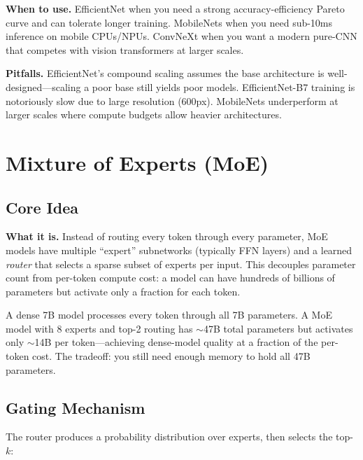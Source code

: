 \textbf{When to use.} EfficientNet when you need a strong accuracy-efficiency Pareto curve and can tolerate longer training. MobileNets when you need sub-10ms inference on mobile CPUs/NPUs. ConvNeXt when you want a modern pure-CNN that competes with vision transformers at larger scales.

\textbf{Pitfalls.} EfficientNet's compound scaling assumes the base architecture is well-designed---scaling a poor base still yields poor models. EfficientNet-B7 training is notoriously slow due to large resolution (600px). MobileNets underperform at larger scales where compute budgets allow heavier architectures.

\section{Mixture of Experts (MoE)}
\label{sec:moe}

\subsection{Core Idea}

\textbf{What it is.} Instead of routing every token through every parameter, MoE models have multiple ``expert'' subnetworks (typically FFN layers) and a learned \textit{router} that selects a sparse subset of experts per input. This decouples parameter count from per-token compute cost: a model can have hundreds of billions of parameters but activate only a fraction for each token.

\begin{keyinsight}
A dense 7B model processes every token through all 7B parameters. A MoE model with 8 experts and top-2 routing has $\sim$47B total parameters but activates only $\sim$14B per token---achieving dense-model quality at a fraction of the per-token cost. The tradeoff: you still need enough memory to hold all 47B parameters.
\end{keyinsight}

\subsection{Gating Mechanism}

The router produces a probability distribution over experts, then selects the top-$k$:

